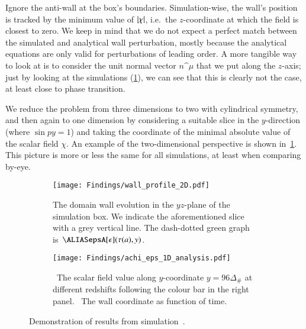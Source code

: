 



Ignore the anti-wall at the box's boundaries. 
Simulation-wise, the wall's position is tracked by the minimum value of $\abs{\chi}$, i.e.~the $z$-coordinate at which the field is closest to zero. %
We keep in mind that we do not expect a perfect match between the simulated and analytical wall perturbation, mostly because the analytical equations are only valid for perturbations of leading order. A more tangible way to look at is to consider the unit normal vector $n\^\mu$ that we put along the $z$-axis; just by looking at the simulations (\cref{fig:results:epsilon:wall_profile_2D}), we can see that this is clearly not the case, at least close to phase transition.


We reduce the problem from three dimensions to two with cylindrical symmetry, and then again to one dimension by considering a suitable slice in the $y$-direction %
(where $\sin{py} =1$) %
and taking the coordinate of the minimal absolute value of the scalar field $\chi$. An example of the two-dimensional perspective is shown in~\cref{fig:results:epsilon:wall_profile_2D}. This picture is more or less the same for all simulations, at least when comparing by-eye.     

\begin{figure}[ht]
    \centering
    \begin{subfigure}[b]{\linewidth}
        \centering
        \texttt{[image: Findings/wall\_profile\_2D.pdf]}
        \caption{The domain wall evolution in the $yz$-plane of the simulation box. We indicate the aforementioned slice with a grey vertical line. The dash-dotted green graph is~$\epsA[\epsilon](\tau(a), y)$.}
        \label{fig:results:epsilon:wall_profile_2D}
    \end{subfigure}
    \hfill
    \begin{subfigure}[b]{\linewidth}
        \centering
        \texttt{[image: Findings/achi\_eps\_1D\_analysis.pdf]}
        \caption{~The scalar field value along $y$-coordinate $y=96\Delta_\#$ at different redshifts following the colour bar in the right panel. ~The wall coordinate as function of time.}
        \label{fig:results:epsilon:achi_eps_1D_analysis}
    \end{subfigure}
    \caption{Demonstration of results from simulation~.}
    \label{fig:results:epsilon:from_achi_to_epsilon}
\end{figure}


